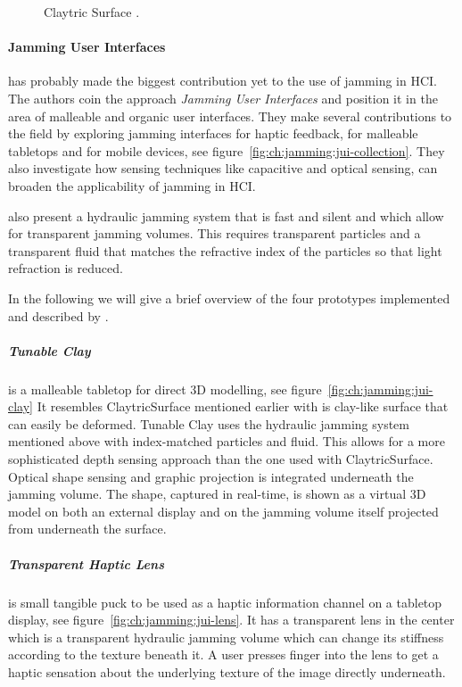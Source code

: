 \begin{figure}
\begin{minipage}[t]{.44\textwidth}
    \caption[Claytric Surface by \citet{matoba2012claytricsurface}.]
    {Claytric Surface \citep{matoba2012claytricsurface}.}
    \label{fig:ch:jamming:claytric-surface}
  \end{minipage}
\end{figure}

\paragraph{Jamming User Interfaces}
\label{ch:jamming:related-work:hci:jui} 
\citet{follmer2012jamming} has probably made the biggest contribution yet to the use of jamming in HCI. 
The authors coin the approach \textit{Jamming User Interfaces} and position it in the area of malleable and organic user interfaces. 
They make several contributions to the field by exploring jamming interfaces for haptic feedback, for malleable tabletops and for mobile devices, see figure~\ref{fig:ch:jamming:jui-collection}. 
They also investigate how sensing techniques like capacitive and optical sensing, can broaden the applicability of jamming in HCI. 

\citet{follmer2012jamming} also present a hydraulic jamming system that is fast and silent and which allow for transparent jamming volumes. 
This requires transparent particles and a transparent fluid that matches the refractive index of the particles so that light refraction is reduced. 


In the following we will give a brief overview of the four prototypes implemented and described by \citet{follmer2012jamming}.

\subparagraph{Tunable Clay} is a malleable tabletop for direct 3D modelling, see figure~\ref{fig:ch:jamming:jui-clay}
It resembles ClaytricSurface \citep{matoba2012claytricsurface} mentioned earlier with is clay-like surface that can easily be deformed.
Tunable Clay uses the hydraulic jamming system mentioned above with index-matched particles and fluid.
This allows for a more sophisticated depth sensing approach than the one used with ClaytricSurface.
Optical shape sensing and graphic projection is integrated underneath the jamming volume.
The shape, captured in real-time, is shown as a virtual 3D model on both an external display and on the jamming volume itself projected from underneath the surface.

\subparagraph{Transparent Haptic Lens} is small tangible puck to be used as a haptic information channel on a tabletop display, see figure~\ref{fig:ch:jamming:jui-lens}.
It has a transparent lens in the center which is a transparent hydraulic jamming volume which can change its stiffness according to the texture beneath it.
A user presses  finger into the lens to get a haptic sensation about the underlying texture of the image directly underneath. 

